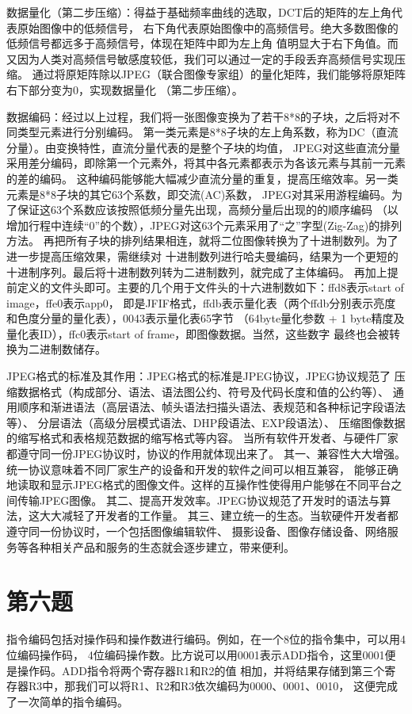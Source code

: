 \documentclass[UTF8]{ctexart}
\begin{document}
数据量化（第二步压缩）：得益于基础频率曲线的选取，DCT后的矩阵的左上角代表原始图像中的低频信号，
右下角代表原始图像中的高频信号。绝大多数图像的低频信号都远多于高频信号，体现在矩阵中即为左上角
值明显大于右下角值。而又因为人类对高频信号敏感度较低，我们可以通过一定的手段丢弃高频信号实现压缩。
通过将原矩阵除以JPEG（联合图像专家组）的量化矩阵，我们能够将原矩阵右下部分变为0，实现数据量化
（第二步压缩）。

数据编码：经过以上过程，我们将一张图像变换为了若干8*8的子块，之后将对不同类型元素进行分别编码。
第一类元素是8*8子块的左上角系数，称为DC（直流分量）。由变换特性，直流分量代表的是整个子块的均值，
JPEG对这些直流分量采用差分编码，即除第一个元素外，将其中各元素都表示为各该元素与其前一元素的差的编码。
这种编码能够能大幅减少直流分量的重复，提高压缩效率。另一类元素是8*8子块的其它63个系数，即交流(AC)系数，
JPEG对其采用游程编码。为了保证这63个系数应该按照低频分量先出现，高频分量后出现的的顺序编码
（以增加行程中连续“0”的个数），JPEG对这63个元素采用了“之”字型(Zig-Zag)的排列方法。
再把所有子块的排列结果相连，就将二位图像转换为了十进制数列。为了进一步提高压缩效果，需继续对
十进制数列进行哈夫曼编码，结果为一个更短的十进制序列。最后将十进制数列转为二进制数列，就完成了主体编码。
再加上提前定义的文件头即可。主要的几个用于文件头的十六进制数如下：ffd8表示start of image，ffe0表示app0，
即是JFIF格式，ffdb表示量化表（两个ffdb分别表示亮度和色度分量的量化表），0043表示量化表65字节
（64byte量化参数 + 1 byte精度及量化表ID），ffc0表示start of frame，即图像数据。当然，这些数字
最终也会被转换为二进制数储存。

JPEG格式的标准及其作用：JPEG格式的标准是JPEG协议，JPEG协议规范了
压缩数据格式（构成部分、语法、语法图公约、符号及代码长度和值的公约等）、
通用顺序和渐进语法（高层语法、帧头语法扫描头语法、表规范和各种标记字段语法等）、
分层语法（高级分层模式语法、DHP段语法、EXP段语法）、
压缩图像数据的缩写格式和表格规范数据的缩写格式等内容。
当所有软件开发者、与硬件厂家都遵守同一份JPEG协议时，协议的作用就体现出来了。
其一、兼容性大大增强。统一协议意味着不同厂家生产的设备和开发的软件之间可以相互兼容，
能够正确地读取和显示JPEG格式的图像文件。这样的互操作性使得用户能够在不同平台之间传输JPEG图像。
其二、提高开发效率。JPEG协议规范了开发时的语法与算法，这大大减轻了开发者的工作量。
其三、建立统一的生态。当软硬件开发者都遵守同一份协议时，一个包括图像编辑软件、
摄影设备、图像存储设备、网络服务等各种相关产品和服务的生态就会逐步建立，带来便利。


\section{第六题}
指令编码包括对操作码和操作数进行编码。例如，在一个8位的指令集中，可以用4位编码操作码，
4位编码操作数。比方说可以用0001表示ADD指令，这里0001便是操作码。ADD指令将两个寄存器R1和R2的值
相加，并将结果存储到第三个寄存器R3中，那我们可以将R1、R2和R3依次编码为0000、0001、0010，
这便完成了一次简单的指令编码。
\end{document}
